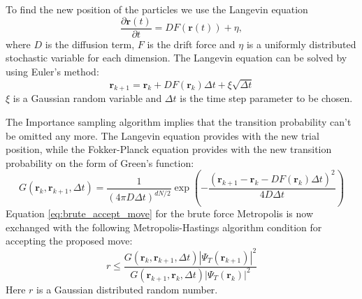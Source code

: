 \documentclass[12pt,a4paper,english]{article}
\begin{document}
To find the new position of the particles we use the Langevin equation
\begin{equation}
\label{eq:Langevin}
\frac{\partial \textbf{r}(t)}{\partial t}=DF(\textbf{r}(t))+\eta,
\end{equation}
where $D$ is the diffusion term, $F$ is the drift force and $\eta$ is a uniformly distributed stochastic variable for each dimension. The Langevin equation can be solved by using Euler's method:
\begin{equation}
\label{eq:Langevin_Euler}
\textbf{r}_{k+1}=\textbf{r}_k+DF(\textbf{r}_k)\Delta t+\xi\sqrt{\Delta t}
\end{equation}
$\xi$ is a Gaussian random variable and $\Delta t$ is the time step parameter to be chosen.

The Importance sampling algorithm implies that the transition probability can't be omitted any more. The Langevin equation provides with the new trial position, while the Fokker-Planck equation provides with the new transition probability on the form of Green's function:
\begin{equation}
\label{eq:Green}
G(\textbf{r}_k,\textbf{r}_{k+1},\Delta t)=\frac{1}{(4\pi D\Delta t)^{dN/2}}\exp\left(-\frac{(\textbf{r}_{k+1}-\textbf{r}_{k}-DF(\textbf{r}_k)\Delta t)^2}{4D\Delta t}\right)
\end{equation}
Equation \ref{eq:brute_accept_move} for the brute force Metropolis is now exchanged with the following Metropolis-Hastings algorithm condition for accepting the proposed move:
\begin{equation}
\label{eq:importance_accept_move}
r\leq\frac{G(\textbf{r}_k,\textbf{r}_{k+1},\Delta t)|\Psi_T(\textbf{r}_{k+1})|^2}{G(\textbf{r}_{k+1},\textbf{r}_{k},\Delta t)|\Psi_T(\textbf{r}_k)|^2}
\end{equation}
Here $r$ is a Gaussian distributed random number.
\end{document}
